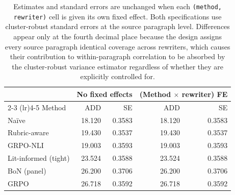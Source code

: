 \begin{table}[h]
  \centering
  \caption{Estimates and standard errors are unchanged when each \texttt{(method, rewriter)} cell is given its own fixed effect. Both specifications use cluster-robust standard errors at the source paragraph level. Differences appear only at the fourth decimal place because the design assigns every source paragraph identical coverage across rewriters, which causes their contribution to within-paragraph correlation to be absorbed by the cluster-robust variance estimator regardless of whether they are explicitly controlled for.}
  \label{tab:fe-comparison}
  \begin{tabular}{lrrrr}
    \toprule
    & \multicolumn{2}{c}{No fixed effects} & \multicolumn{2}{c}{(Method $\times$ rewriter) FE} \\
    \cmidrule(lr){2-3} \cmidrule(lr){4-5}
    Method & ADD & SE & ADD & SE \\
    \midrule
    Na\"ive                & 18.120 & 0.3583 & 18.120 & 0.3583 \\
    Rubric-aware           & 19.430 & 0.3537 & 19.430 & 0.3537 \\
    GRPO-NLI               & 19.003 & 0.3593 & 19.003 & 0.3593 \\
    Lit-informed (tight)   & 23.524 & 0.3588 & 23.524 & 0.3588 \\
    BoN (panel)            & 26.200 & 0.3706 & 26.200 & 0.3706 \\
    GRPO                   & 26.718 & 0.3592 & 26.718 & 0.3592 \\
    \bottomrule
  \end{tabular}
\end{table}
